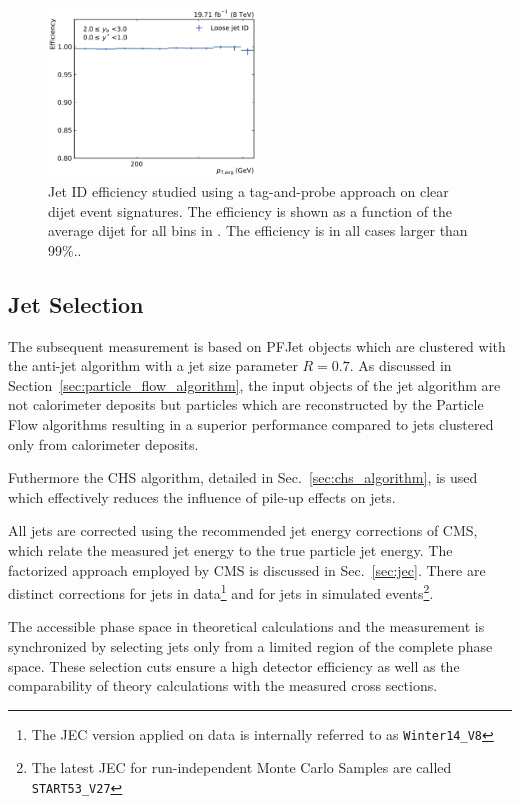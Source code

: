 \begin{figure}[htbp]
    \includegraphics[width=0.49\textwidth]{figures/measurement/jetideff_yb2ys0.pdf}
    \caption[Efficiency of the jet ID]{Jet ID efficiency studied using a
    tag-and-probe approach on clear dijet event signatures. The efficiency is
    shown as a function of the average dijet \pt for all bins in \ystar \yboost. The
    efficiency is in all cases larger than 99\%..}
    \label{fig:jetid_eff}
\end{figure}

\subsection{Jet Selection}

The subsequent measurement is based on PFJet objects which are clustered
with the anti-\kt jet algorithm with a jet size parameter $R=0.7$. As discussed in
Section~\ref{sec:particle_flow_algorithm}, the input objects of the jet algorithm are not
calorimeter deposits but particles which are reconstructed by the Particle Flow
algorithms resulting in a superior performance compared to jets clustered only from
calorimeter deposits. 

Futhermore the CHS algorithm, detailed in Sec.~\ref{sec:chs_algorithm}, is used which effectively
reduces the influence of pile-up effects on jets.

All jets are corrected using the recommended jet energy corrections of CMS,
which relate the measured jet energy to the true particle jet energy. The
factorized approach employed by CMS is discussed in Sec.~\ref{sec:jec}. There are
distinct corrections for jets in data\footnote{The JEC version applied on data
    is internally referred to as \texttt{Winter14\_V8}} and for jets in simulated
events\footnote{The latest JEC for run-independent Monte Carlo Samples are
    called \texttt{START53\_V27}}.


The accessible phase space in theoretical calculations and the measurement is
synchronized by selecting jets only from a limited region of the complete phase
space. These selection cuts ensure a high detector efficiency as well as the
comparability of theory calculations with the measured cross sections.

